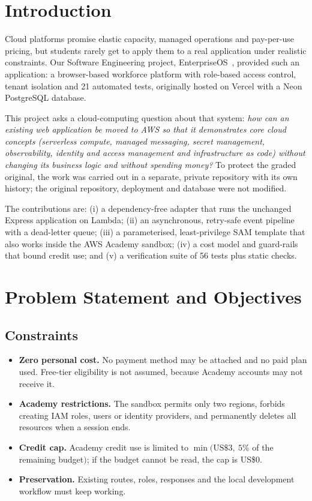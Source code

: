 \documentclass[conference]{IEEEtran}
\begin{document}
\section{Introduction}
Cloud platforms promise elastic capacity, managed operations and pay-per-use pricing, but
students rarely get to apply them to a real application under realistic constraints. Our
Software Engineering project, EnterpriseOS~\cite{se-report}, provided such an application: a
browser-based workforce platform with role-based access control, tenant isolation and 21
automated tests, originally hosted on Vercel with a Neon PostgreSQL database.

This project asks a cloud-computing question about that system: \emph{how can an existing
web application be moved to AWS so that it demonstrates core cloud concepts (serverless
compute, managed messaging, secret management, observability, identity and access management
and infrastructure as code) without changing its business logic and without spending money?}
To protect the graded original, the work was carried out in a separate, private repository
with its own history; the original repository, deployment and database were not modified.

The contributions are: (i) a dependency-free adapter that runs the unchanged Express
application on Lambda; (ii) an asynchronous, retry-safe event pipeline with a dead-letter
queue; (iii) a parameterised, least-privilege SAM template that also works inside the AWS
Academy sandbox; (iv) a cost model and guard-rails that bound credit use; and (v) a
verification suite of 56 tests plus static checks.

\section{Problem Statement and Objectives}
\subsection{Constraints}
\begin{itemize}
\item \textbf{Zero personal cost.} No payment method may be attached and no paid plan used.
Free-tier eligibility is not assumed, because Academy accounts may not receive it.
\item \textbf{Academy restrictions.} The sandbox permits only two regions, forbids creating
IAM roles, users or identity providers, and permanently deletes all resources when a
session ends.
\item \textbf{Credit cap.} Academy credit use is limited to $\min(\text{US}\$3,\ 5\%$ of the
remaining budget$)$; if the budget cannot be read, the cap is US\$0.
\item \textbf{Preservation.} Existing routes, roles, responses and the local development
workflow must keep working.
\end{itemize}
\end{document}
